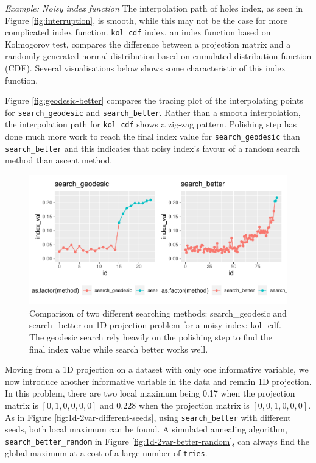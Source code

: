 \documentclass[12pt]{article}
\begin{document}
\emph{Example: Noisy index function} The interpolation path of holes
index, as seen in Figure \ref{fig:interruption}, is smooth, while this
may not be the case for more complicated index function.
\texttt{kol\_cdf} index, an index function based on Kolmogorov test,
compares the difference between a projection matrix and a randomly
generated normal distribution based on cumulated distribution function
(CDF). Several visualisations below shows some characteristic of this
index function.

Figure \ref{fig:geodesic-better} compares the tracing plot of the
interpolating points for \texttt{search\_geodesic} and
\texttt{search\_better}. Rather than a smooth interpolation, the
interpolation path for \texttt{kol\_cdf} shows a zig-zag pattern.
Polishing step has done much more work to reach the final index value
for \texttt{search\_geodesic} than \texttt{search\_better} and this
indicates that noisy index's favour of a random search method than
ascent method.

\begin{figure}
\centering
\includegraphics{paper_files/figure-latex/geodesic-better-1.pdf}
\caption{Comparison of two different searching methods: search\_geodesic
and search\_better on 1D projection problem for a noisy index: kol\_cdf.
The geodesic search rely heavily on the polishing step to find the final
index value while search better works well.}
\end{figure}

Moving from a 1D projection on a dataset with only one informative
variable, we now introduce another informative variable in the data and
remain 1D projection. In this problem, there are two local maximum being
0.17 when the projection matrix is \([0, 1, 0, 0, 0, 0]\) and 0.228 when
the projection matrix is \([0, 0, 1 ,0, 0, 0]\). As in Figure
\ref{fig:1d-2var-different-seeds}, using \texttt{search\_better} with
different seeds, both local maximum can be found. A simulated annealing
algorithm, \texttt{search\_better\_random} in Figure
\ref{fig:1d-2var-better-random}, can always find the global maximum at a
cost of a large number of \texttt{tries}.
\end{document}
